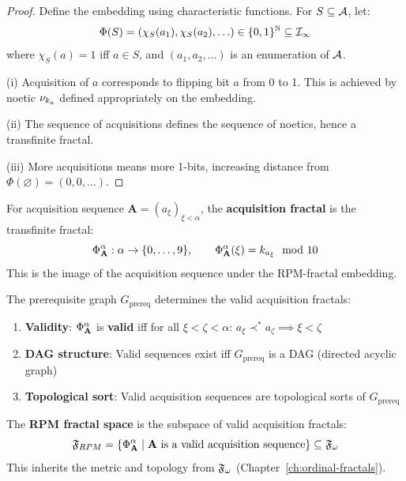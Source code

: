 \begin{proof}
Define the embedding using characteristic functions. For $S \subseteq \mathcal{A}$, let:
\[
\Phi(S) = \left(\chi_S(a_1), \chi_S(a_2), \ldots\right) \in \{0,1\}^{\mathbb{N}} \subseteq \mathcal{I}_\infty
\]
where $\chi_S(a) = 1$ iff $a \in S$, and $(a_1, a_2, \ldots)$ is an enumeration of $\mathcal{A}$.

(i) Acquisition of $a$ corresponds to flipping bit $a$ from 0 to 1. This is achieved by noetic $\nu_{k_a}$ defined appropriately on the embedding.

(ii) The sequence of acquisitions defines the sequence of noetics, hence a transfinite fractal.

(iii) More acquisitions means more 1-bits, increasing distance from $\Phi(\varnothing) = (0,0,\ldots)$.
\end{proof}

\begin{definition}
\label{def:acquisition-fractal}
For acquisition sequence $\mathbf{A} = (a_\xi)_{\xi < \alpha}$, the \textbf{acquisition fractal} is the transfinite fractal:
\[
\Phi^{\alpha}_\mathbf{A} : \alpha \to \{0, \ldots, 9\}, \qquad \Phi^{\alpha}_\mathbf{A}(\xi) = k_{a_\xi} \mod 10
\]
This is the image of the acquisition sequence under the RPM-fractal embedding.
\end{definition}

\begin{proposition}
\label{prop:prereq-graph-structure}
The prerequisite graph $G_\mathrm{prereq}$ determines the valid acquisition fractals:
\begin{enumerate}[label=(\roman*)]
  \item \textbf{Validity}: $\Phi^{\alpha}_\mathbf{A}$ is \textbf{valid} iff for all $\xi < \zeta < \alpha$: $a_\xi \prec^* a_\zeta \implies \xi < \zeta$
  \item \textbf{DAG structure}: Valid sequences exist iff $G_\mathrm{prereq}$ is a DAG (directed acyclic graph)
  \item \textbf{Topological sort}: Valid acquisition sequences are topological sorts of $G_\mathrm{prereq}$
\end{enumerate}
\end{proposition}

\begin{definition}
\label{def:rpm-fractal-space}
The \textbf{RPM fractal space} is the subspace of valid acquisition fractals:
\[
\mathfrak{F}_{RPM} = \{\Phi^{\alpha}_\mathbf{A} \mid \mathbf{A} \text{ is a valid acquisition sequence}\} \subseteq \mathfrak{F}_\omega
\]
This inherits the metric and topology from $\mathfrak{F}_\omega$ (Chapter~\ref{ch:ordinal-fractals}).
\end{definition}


